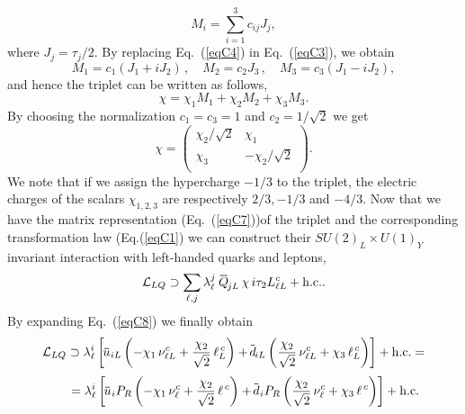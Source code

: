 \documentclass[aps,preprint,tightenlines,floatfix,superscriptaddress,nofootinbib,showpacs]{revtex4-1}
\def\beq{\begin{equation}}
\def\eeq{\end{equation}}
\newcommand*\xbar[1]{%
  \hbox{%
    \vbox{%
      \hrule height 0.5pt %
      \kern0.3ex%
      \hbox{%
        \kern-0.1em%
        \ensuremath{#1}%
        \kern-0.1em%
      }%
    }%
  }%
}
\begin{document}
\beq
\label{eqC4}
M_i=\sum^3_{i=1} c_{ij}J_j,
\eeq
where $J_j=\tau_j/2$. By replacing Eq.~(\ref{eqC4}) in Eq.~(\ref{eqC3}), we obtain
\beq
\label{eqC5}
M_1=c_1(J_1+iJ_2)\, ,\quad M_2=c_2 J_3\, , \quad M_3=c_3(J_1-iJ_2), 
\eeq
and hence the triplet can be written as follows,
\beq
\label{eqC6}
\chi=\chi_1 M_1 + \chi_2 M_2 + \chi_3 M_3.
\eeq
By choosing the normalization $c_1=c_3=1$ and $c_2=1/\sqrt{2}$ we get
\beq
\label{eqC7}
\chi =
\begin{pmatrix}
\chi_2/\sqrt{2} & \chi_1 \\
\chi_3 & -\chi_2/\sqrt{2} \\
\end{pmatrix}
.
\eeq
We note that if we assign the hypercharge $-1/3$ to the triplet, the electric charges of the scalars $\chi_{1,2,3}$ are respectively $2/3,-1/3$ and $-4/3$. Now that we have the matrix representation (Eq.~(\ref{eqC7}))of the triplet and the corresponding transformation law (Eq.(\ref{eqC1}) we can construct their $SU(2)_L\times U(1)_Y$ invariant interaction with left-handed quarks and leptons,
\beq
\label{eqC8}
\mathcal{L}_{LQ}\supset \sum_{\ell,j} \lambda^j_{\ell}\,\,\xbar{Q}_{jL}\,\chi\, i\tau_2 L^c_{\ell L} + \mathrm{h.c.}.
\eeq 	
By expanding Eq.~(\ref{eqC8}) we finally obtain
\beq
\nonumber
\mathcal{L}_{LQ}\supset \lambda^i_{\ell}\left[\xbar{u}_{\,iL}\left(-\chi_1\,\nu^c_{\ell L}+\frac{\chi_2}{\sqrt{2}}\,\ell^{\,c}_L\right)+\xbar{d}_{iL}\left(\frac{\chi_2}{\sqrt{2}}\,\nu^c_{\ell L}+\chi_3\,\ell^{\,c}_L\right)\right]+\mathrm{h.c.}=
\eeq
\beq
\label{eqC9}
\qquad=\lambda^i_{\ell}\left[\xbar{u}_{\,i}P_R\left(-\chi_1\,\nu^c_{\ell}+\frac{\chi_2}{\sqrt{2}}\,\ell^{\,c}\right)+\xbar{d}_{\,i}P_R\left(\frac{\chi_2}{\sqrt{2}}\,\nu^c_{\ell}+\chi_3\,\ell^{\,c}\right)\right]+\mathrm{h.c.}\,
\eeq
\section*{\refname}
\let\bibsection\relax

\setlength{\bibsep}{10pt}


\end{document}
